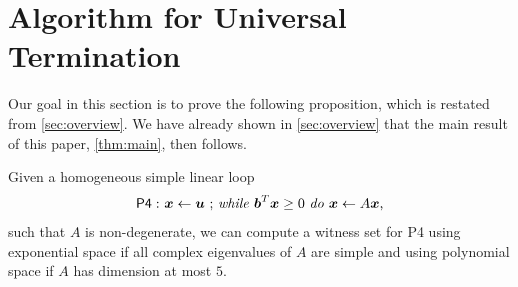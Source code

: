 \section{Algorithm for Universal Termination}
Our goal in this section is to prove the following proposition, which
is restated from \cref{sec:overview}.  We have already shown in
\cref{sec:overview} that the main result of this paper,
\cref{thm:main}, then follows.

\begin{proposition}
Given a homogeneous simple linear loop
\begin{gather*}
\mathsf{P4:}\ \mbox{$\boldsymbol{x}\gets \boldsymbol{u}$ ;
\textit{while} $\boldsymbol{b}^T\boldsymbol{x} \geq 0$ \textit{do} $\boldsymbol{x}\leftarrow A\boldsymbol{x}$,}
\end{gather*}
such that $A$ is non-degenerate, we can compute a
witness set for \textsf{P4} using exponential space if all complex eigenvalues of $A$ are simple and using polynomial space if $A$ has dimension at most $5$.
\label{prop:main2}
\end{proposition}


